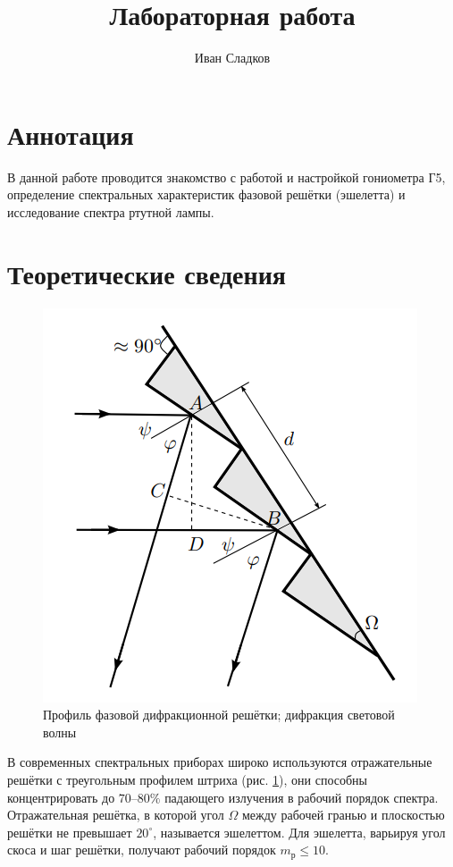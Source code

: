 \documentclass[a4paper]{article}
\title{Лабораторная работа \labnum \space \labname} %
\author{Иван Сладков}
\begin{document}
\maketitle
\thispagestyle{empty}
\section{Аннотация}
В данной работе проводится  знакомство с работой и настройкой гониометра Г5, определение спектральных характеристик фазовой решётки (эшелетта) и исследование спектра ртутной лампы.

\section{Теоретические сведения}

\begin{figure}[tbp]
	\centering
	\includegraphics[width=0.8\linewidth]{Screenshot_2}
	\caption{Профиль фазовой дифракционной решётки; дифракция световой волны}
	\label{fig:решёткаВпрофиль}
\end{figure}

В современных спектральных приборах широко используются отражательные решётки с треугольным профилем штриха (рис. \ref{fig:решёткаВпрофиль}), они способны концентрировать до $ 70–80\% $ падающего излучения в рабочий порядок спектра. Отражательная решётка, в которой угол $ \Omega $ между рабочей гранью и плоскостью решётки не превышает $ 20^\circ $, называется эшелеттом. Для эшелетта, варьируя угол скоса и шаг решётки, получают рабочий порядок $ m_р \le 10 $.
\end{document}
